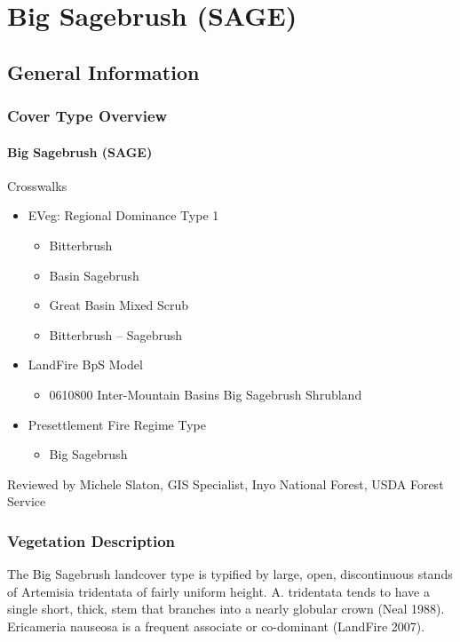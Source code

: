 
\section{Big Sagebrush (SAGE)}
\label{sage-description}
\subsection*{General Information}

\subsubsection{Cover Type Overview}

\paragraph{Big Sagebrush (SAGE)}

Crosswalks
\begin{itemize}
	\item EVeg: Regional Dominance Type 1
	\begin{itemize}
		\item Bitterbrush 
		\item Basin Sagebrush
		\item Great Basin Mixed Scrub
		\item Bitterbrush – Sagebrush
	\end{itemize}

	\item LandFire BpS Model
	\begin{itemize}
		\item 0610800 Inter-Mountain Basins Big Sagebrush Shrubland
	\end{itemize}

	\item Presettlement Fire Regime Type
	\begin{itemize}
		\item Big Sagebrush
	\end{itemize}
\end{itemize}

Reviewed by Michele Slaton, GIS Specialist, Inyo National Forest, USDA Forest Service

\subsubsection{Vegetation Description}
The Big Sagebrush landcover type is typified by large, open, discontinuous stands of Artemisia tridentata of fairly uniform height. A. tridentata tends to have a single short, thick, stem that branches into a nearly globular crown (Neal 1988). Ericameria nauseosa is a frequent associate or co-dominant (LandFire 2007).

